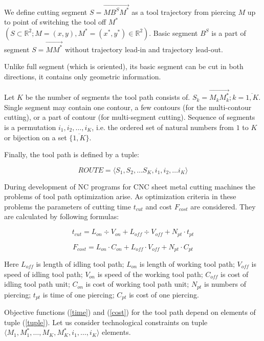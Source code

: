 \documentclass{../download/tPRS2e}
\begin{document}
We define cutting segment  $S = \overrightarrow{M B^S M^*}$
as a tool trajectory from piercing  $M$ up to point of switching the tool off  $M^*$
$(S \subset \mathbb{R}^2; M = (x, y), M^ *= (x^*, y^*) \in \mathbb{R}^2)$.
Basic segment $B^S$ is a part of segment $S = \overrightarrow{M M^*}$
without trajectory lead-in and trajectory lead-out.

Unlike full segment (which is oriented),
its basic segment can be cut in both directions,
it contains only geometric information.

Let $K$ be the number of segments the tool path consists of.
$S_k = \overrightarrow{M_k M_k^*}; k = \overline{1, K}$.
Single segment may contain one contour,
a few contours (for the multi-contour cutting),
or a part of contour (for multi-segment cutting).
Sequence of segments is a permutation $i_1, i_2, \dots, i_K$,
i.e. the ordered set of natural numbers from $1$ to $K$
or bijection on a set $\{\overline{1, K}\}$.

Finally, the tool path is defined by a tuple:

\begin{equation} \label {tuple}
ROUTE = \langle S_1, S_2, \dots S_K, i_1, i_2, \dots i_K \rangle 
\end{equation}

During development of NC programs for CNC sheet metal cutting machines the problems of tool path optimization arise.
As optimization criteria in these problems the parameters of cutting time $t_{cut}$ and cost $F_{cost}$ are considered.
They are calculated by following formulas:

\begin{equation} \label{time}
t_{cut} = L_{on} \div V_{on} + L_{off} \div V_{off} + N_{pt} \cdot t_{pt}
\end{equation}

\begin{equation} \label {cost}
F_{cost} = L_{on} \cdot C_{on} + L_{off} \cdot V_{off} + N_{pt} \cdot C_{pt}
\end{equation}

Here $L_{off}$ is length of idling tool path;
$L_{on}$ is length of working tool path;
$V_{off}$ is speed of idling tool path;
$V_{on}$ is speed of the working tool path;
$C_{off}$ is cost of idling tool path unit;
$C_{on}$ is cost of working tool path unit;
$N_{pt}$ is numbers of piercing;
$t_{pt}$ is time of one piercing;
$C_{pt}$ is cost of one piercing.

Objective functions (\ref{time}) and (\ref{cost})
for the tool path depend on elements of tuple (\ref{tuple}).
Let us consider technological constraints on tuple
$\langle M_1, M_1^*, \dots , M_K, M_K^*, i_1, \dots , i_K \rangle$
elements.
\end{document}
